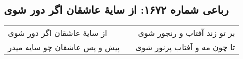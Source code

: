 \begin{center}
\section*{رباعی شماره ۱۶۷۲: از سایهٔ عاشقان اگر دور شوی}
\label{sec:1672}
\begin{longtable}{l p{0.5cm} r}
از سایهٔ عاشقان اگر دور شوی
&&
بر تو زند آفتاب و رنجور شوی
\\
پیش و پس عاشقان چو سایه میدر
&&
تا چون مه و آفتاب پرنور شوی
\\
\end{longtable}
\end{center}
